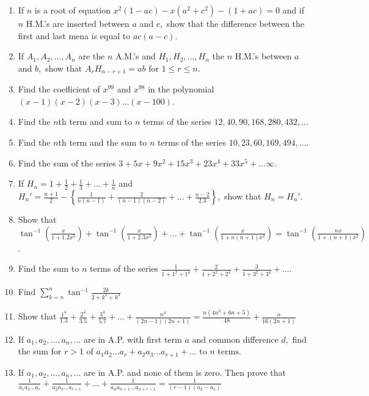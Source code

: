 \begin{enumerate}
\item If $n$ is a root of equation $x^2(1 - ac) - x(a^2+c^2) - (1 + ac) = 0$ and if $n$ H.M.'s are inserted between $a$
  and $c,$ show that the difference between the first and last mena is equal to $ac(a - c)$.
\item If $A_1, A_2, \ldots, A_n$ are the $n$ A.M.'s and $H_1, H_2, \ldots, H_n$ the $n$ H.M.'s between $a$ and $b,$ show
  that $A_rH_{n - r + 1} = ab$ for $1\leq r\leq n$.
\item Find the coefficient of $x^{99}$ and $x^{98}$ in the polynomial $(x - 1)(x - 2)(x - 3)\ldots(x - 100)$.
\item Find the $n$th term and sum to $n$ terms of the series $12, 40, 90, 168, 280, 432, \ldots$
\item Find the $n$th term and the sum to $n$ terms of the series $10, 23, 60, 169, 494, \ldots$.
\item Find the sum of the series $3 + 5x + 9x^2 + 15x^3 + 23x^4 + 33x^5 + \ldots \infty$.
\item If $H_n = 1 + \frac{1}{2} + \frac{1}{3} + \ldots + \frac{1}{n}$ and $H_n' = \frac{n + 1}{2} - \left\{\frac{1}{n(n - 1)}
  + \frac{2}{(n - 1)(n - 2)} + \ldots + \frac{n - 2}{2.3}\right\},$ show that $H_n = H_n'$.
\item Show that $\tan^{-1}\left(\frac{x}{1 + 1.2x^2}\right) + \tan^{-1}\left(\frac{x}{1 + 2.3x^2}\right) + \ldots+
  \tan^{-1}\left(\frac{x}{1 + n(n + 1)x^2}\right) = \tan^{-1}\left(\frac{nx}{1 + (n + 1)x^2}\right)$.
\item Find the sum to $n$ terms of the series $\frac{1}{1 + 1^2 + 1^4} + \frac{2}{1 + 2^2 + 2^4} + \frac{3}{1 + 3^2 +
  3^4} + \ldots$.
\item Find $\displaystyle\sum_{k=n}^n\tan^{-1}\frac{2k}{2 + k^2 + k^4}$
\item Show that $\frac{1^4}{1.3} + \frac{2^4}{3.5} + \frac{3^4}{5.7} + \ldots + \frac{n^4}{(2n - 1)(2n + 1)} =
  \frac{n(4n^2 + 6n + 5)}{48} + \frac{n}{16(2n + 1)}$
\item If $a_1, a_2, \ldots, a_n, \ldots$ are in A.P. with first term $a$ and common difference $d,$ find the sum for $r >
  1$ of $a_1a_2\ldots a_r + a_2a_3\ldots a_{r + 1} + \ldots \text{~to~}n\text{~terms}$.
\item If $a_1, a_2, \ldots, a_n, \ldots$ are in A.P. and none of them is zero. Then prove that $\frac{1}{a_1a_2\ldots
    a_r} + \frac{1}{a_2a_3\ldots a_{r + 1}} + \ldots + \frac{1}{a_na_{n + 1}\ldots a_{n + r - 1}} = \frac{1}{(r - 1)(a_2 -
  a_1)}$


\end{enumerate}
